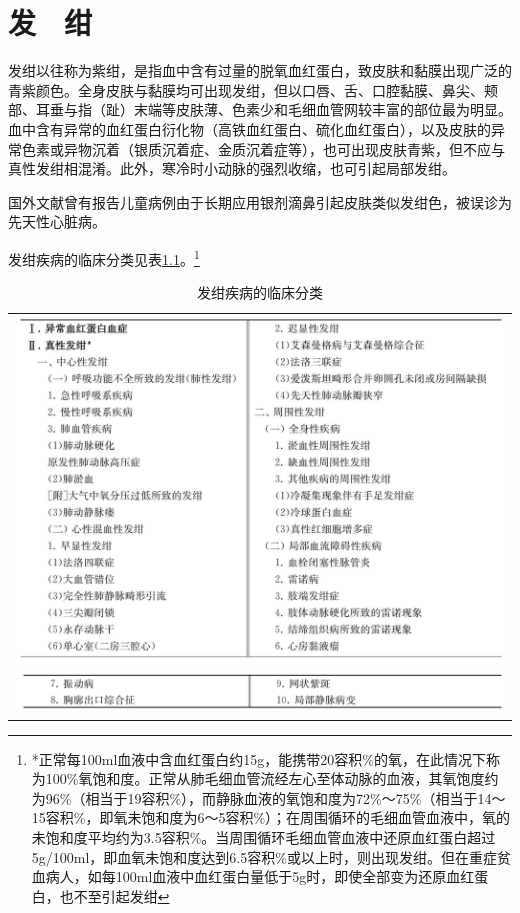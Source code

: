 \chapter{发　绀}

发绀以往称为紫绀，是指血中含有过量的脱氧血红蛋白，致皮肤和黏膜出现广泛的青紫颜色。全身皮肤与黏膜均可出现发绀，但以口唇、舌、口腔黏膜、鼻尖、颊部、耳垂与指（趾）末端等皮肤薄、色素少和毛细血管网较丰富的部位最为明显。血中含有异常的血红蛋白衍化物（高铁血红蛋白、硫化血红蛋白），以及皮肤的异常色素或异物沉着（银质沉着症、金质沉着症等），也可出现皮肤青紫，但不应与真性发绀相混淆。此外，寒冷时小动脉的强烈收缩，也可引起局部发绀。

国外文献曾有报告儿童病例由于长期应用银剂滴鼻引起皮肤类似发绀色，被误诊为先天性心脏病。

发绀疾病的临床分类见表\ref{tab14-1}。\footnote{*正常每100ml血液中含血红蛋白约15g，能携带20容积\%的氧，在此情况下称为100\%氧饱和度。正常从肺毛细血管流经左心至体动脉的血液，其氧饱度约为96\%（相当于19容积\%），而静脉血液的氧饱和度为72\%～75\%（相当于14～15容积\%，即氧未饱和度为6～5容积\%）；在周围循环的毛细血管血液中，氧的未饱和度平均约为3.5容积\%。当周围循环毛细血管血液中还原血红蛋白超过5g/100ml，即血氧未饱和度达到6.5容积\%或以上时，则出现发绀。但在重症贫血病人，如每100ml血液中血红蛋白量低于5g时，即使全部变为还原血红蛋白，也不至引起发绀}

\begin{longtable}{c}
 \caption{发绀疾病的临床分类}
 \label{tab14-1}
 \endfirsthead
 \caption[]{发绀疾病的临床分类}
 \endhead
 \includegraphics[width=\textwidth,height=\textheight,keepaspectratio]{./images/Image00091.jpg}\\
 \includegraphics[width=\textwidth,height=\textheight,keepaspectratio]{./images/Image00092.jpg}
 \end{longtable}
 
